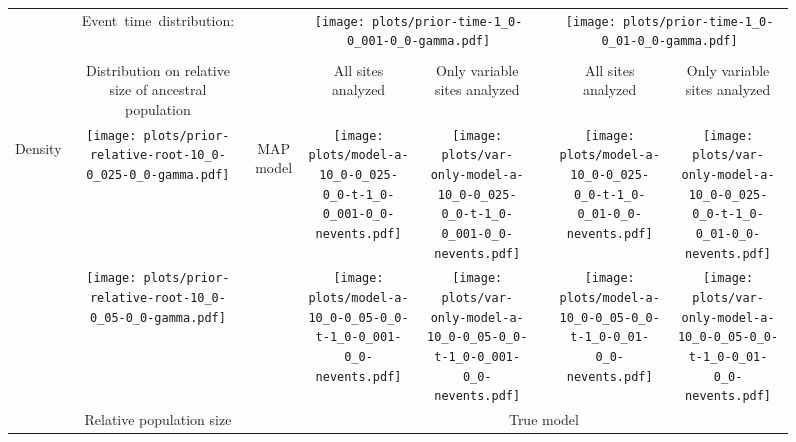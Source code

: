 \documentclass[border=10pt,varwidth=30cm]{standalone}
\begin{document}
\begin{figure}
    \centering
    \begin{tabular}{@{}cccccccc@{}}
        & \multirow{1}{0.15\textwidth}[8em]{\centering\Large Event~time~distribution:}
        &
        & \multicolumn{2}{c}{\texttt{[image: plots/prior-time-1\_0-0\_001-0\_0-gamma.pdf]}}
        &
        & \multicolumn{2}{c}{\texttt{[image: plots/prior-time-1\_0-0\_01-0\_0-gamma.pdf]}} \\
        \cline{1-2}\cline{4-5}\cline{7-8}
        & & & & & & & \\
        & \multirow{1}{0.15\textwidth}{\centering\Large Distribution on relative size of ancestral population}
        &
        & \multirow{1}{0.15\textwidth}{\centering\Large All sites analyzed}
        & \multirow{1}{0.15\textwidth}{\centering\Large Only variable sites analyzed}
        &
        & \multirow{1}{0.15\textwidth}{\centering\Large All sites analyzed}
        & \multirow{1}{0.15\textwidth}{\centering\Large Only variable sites analyzed} \\[9ex]
        \multirow{2}{*}[1em]{\begin{sideways}\large Density\end{sideways}}
        & \texttt{[image: plots/prior-relative-root-10\_0-0\_025-0\_0-gamma.pdf]}
        & \multirow{2}{*}[2em]{\begin{sideways}\large MAP model\end{sideways}}
        & \texttt{[image: plots/model-a-10\_0-0\_025-0\_0-t-1\_0-0\_001-0\_0-nevents.pdf]}
        & \texttt{[image: plots/var-only-model-a-10\_0-0\_025-0\_0-t-1\_0-0\_001-0\_0-nevents.pdf]}
        &
        & \texttt{[image: plots/model-a-10\_0-0\_025-0\_0-t-1\_0-0\_01-0\_0-nevents.pdf]}
        & \texttt{[image: plots/var-only-model-a-10\_0-0\_025-0\_0-t-1\_0-0\_01-0\_0-nevents.pdf]} \\
        & \texttt{[image: plots/prior-relative-root-10\_0-0\_05-0\_0-gamma.pdf]}
        &
        & \texttt{[image: plots/model-a-10\_0-0\_05-0\_0-t-1\_0-0\_001-0\_0-nevents.pdf]}
        & \texttt{[image: plots/var-only-model-a-10\_0-0\_05-0\_0-t-1\_0-0\_001-0\_0-nevents.pdf]}
        &
        & \texttt{[image: plots/model-a-10\_0-0\_05-0\_0-t-1\_0-0\_01-0\_0-nevents.pdf]}
        & \texttt{[image: plots/var-only-model-a-10\_0-0\_05-0\_0-t-1\_0-0\_01-0\_0-nevents.pdf]} \\
        & \multirow{1}{0.15\textwidth}{\centering\large Relative population size}
        &
        & \multicolumn{5}{c}{\large True model} \\
    \end{tabular}
\end{figure}
\end{document}
